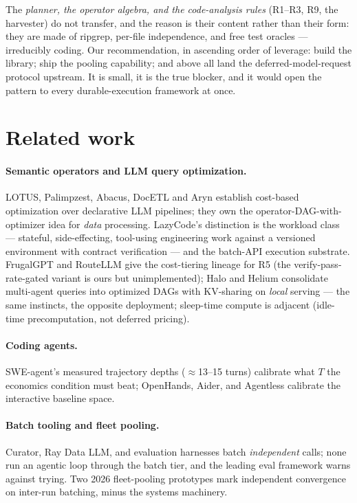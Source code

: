 \documentclass[11pt]{article}
\begin{document}
The \emph{planner, the operator algebra, and the code-analysis rules} (R1--R3, R9, the harvester) do not transfer, and the reason is their content rather than their form: they are made of ripgrep, per-file independence, and free test oracles --- irreducibly coding. Our recommendation, in ascending order of leverage: build the library; ship the pooling capability; and above all land the deferred-model-request protocol upstream. It is small, it is the true blocker, and it would open the pattern to every durable-execution framework at once.

\section{Related work}
\label{sec:related}

\paragraph{Semantic operators and LLM query optimization.} LOTUS, Palimpzest, Abacus, DocETL and Aryn establish cost-based optimization over declarative LLM pipelines; they own the operator-DAG-with-optimizer idea for \emph{data} processing. LazyCode's distinction is the workload class --- stateful, side-effecting, tool-using engineering work against a versioned environment with contract verification --- and the batch-API execution substrate. FrugalGPT and RouteLLM give the cost-tiering lineage for R5 (the verify-pass-rate-gated variant is ours but unimplemented); Halo and Helium consolidate multi-agent queries into optimized DAGs with KV-sharing on \emph{local} serving --- the same instincts, the opposite deployment; sleep-time compute is adjacent (idle-time precomputation, not deferred pricing).

\paragraph{Coding agents.} SWE-agent's measured trajectory depths ($\approx$13--15 turns) calibrate what $T$ the economics condition must beat; OpenHands, Aider, and Agentless calibrate the interactive baseline space.

\paragraph{Batch tooling and fleet pooling.} Curator, Ray Data LLM, and evaluation harnesses batch \emph{independent} calls; none run an agentic loop through the batch tier, and the leading eval framework warns against trying. Two 2026 fleet-pooling prototypes mark independent convergence on inter-run batching, minus the systems machinery.
\end{document}
